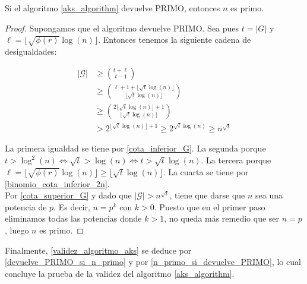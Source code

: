 \begin{lema}\label{n_primo_si_devuelve_PRIMO}
	Si el algoritmo \ref{aks_algorithm} devuelve PRIMO, entonces $n$ es primo. 
\end{lema}

\begin{proof}
	Supongamos que el algoritmo devuelve PRIMO. Sea pues $t = |G|$ y $\ell = \lfloor \sqrt{\phi(r)}\log(n) \rfloor$. Entonces tenemos la siguiente cadena de desigualdades:
	
	\begin{align}
	|\mathcal{G}| &\geq \binom{t + \ell}{t - 1}\\
	&\geq \binom{\ell + 1 + \lfloor \sqrt{t}\log(n) \rfloor}{\lfloor \sqrt{t}\log(n) \rfloor}\\
	&\geq \binom{2\lfloor \sqrt{t}\log(n) \rfloor + 1}{\lfloor \sqrt{t}\log(n) \rfloor}\\
	&> 2^{\lfloor \sqrt{t}\log(n) \rfloor + 1} \geq 2^{\sqrt{t}\log(n)} \geq n^{\sqrt{t}}
	\end{align}
	
	La primera igualdad se tiene por \autoref{cota_inferior_G}. La segunda porque $t > \log^2(n) \Leftrightarrow \sqrt{t} > \log(n) \Leftrightarrow t > \sqrt{t}\log(n)$. La tercera porque $\ell = \lfloor \sqrt{\phi(r)}\log(n) \rfloor \geq \lfloor \sqrt{t}\log(n) \rfloor$. La cuarta se tiene por \autoref{binomio_cota_inferior_2n}.\\
	
	Por \autoref{cota_superior_G} y dado que $|\mathcal{G}| > n^{\sqrt{t}}$, tiene que darse que $n$ sea una potencia de $p$. Es decir, $n = p^k$ con $k > 0$. Puesto que en el primer paso eliminamos todas las potencias donde $k > 1$, no queda más remedio que ser $n = p$, luego $n$ es primo.
\end{proof}

Finalmente, \autoref{validez_algoritmo_aks} se deduce por \autoref{devuelve_PRIMO_si_n_primo} y por \autoref{n_primo_si_devuelve_PRIMO}, lo cual concluye la prueba de la validez del algoritmo \ref{aks_algorithm}.

\endinput
